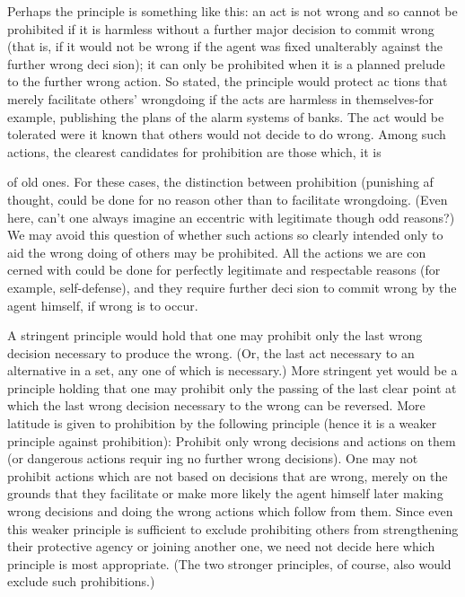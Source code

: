 \documentclass[11pt,openany]{book}
\begin{document}
Perhaps the principle is something like this: an act is not wrong and so cannot be prohibited if it is harmless without a further major decision to commit wrong (that is, if it would not be wrong if the agent was fixed unalterably against the further wrong deci sion); it can only be prohibited when it is a planned prelude to the further wrong action. So stated, the principle would protect ac tions that merely facilitate others' wrongdoing if the acts are harmless in themselves-for example, publishing the plans of the alarm systems of banks. The act would be tolerated were it known that others would not decide to do wrong. Among such actions, the clearest candidates for prohibition are those which, it is 

of old ones. For these cases, the distinction between prohibition (punishing af thought, could be done for no reason other than to facilitate wrongdoing. (Even here, can't one always imagine an eccentric with legitimate though odd reasons?) We may avoid this question of whether such actions so clearly intended only to aid the wrong doing of others may be prohibited. All the actions we are con cerned with could be done for perfectly legitimate and respectable reasons (for example, self-defense), and they require further deci sion to commit wrong by the agent himself, if wrong is to occur. 

A stringent principle would hold that one may prohibit only the last wrong decision necessary to produce the wrong. (Or, the last act necessary to an alternative in a set, any one of which is necessary.) More stringent yet would be a principle holding that one may prohibit only the passing of the last clear point at which the last wrong decision necessary to the wrong can be reversed. More latitude is given to prohibition by the following principle (hence it is a weaker principle against prohibition): Prohibit only wrong decisions and actions on them (or dangerous actions requir ing no further wrong decisions). One may not prohibit actions which are not based on decisions that are wrong, merely on the grounds that they facilitate or make more likely the agent himself later making wrong decisions and doing the wrong actions which follow from them. Since even this weaker principle is sufficient to exclude prohibiting others from strengthening their protective agency or joining another one, we need not decide here which principle is most appropriate. (The two stronger principles, of course, also would exclude such prohibitions.) 
\end{document}

